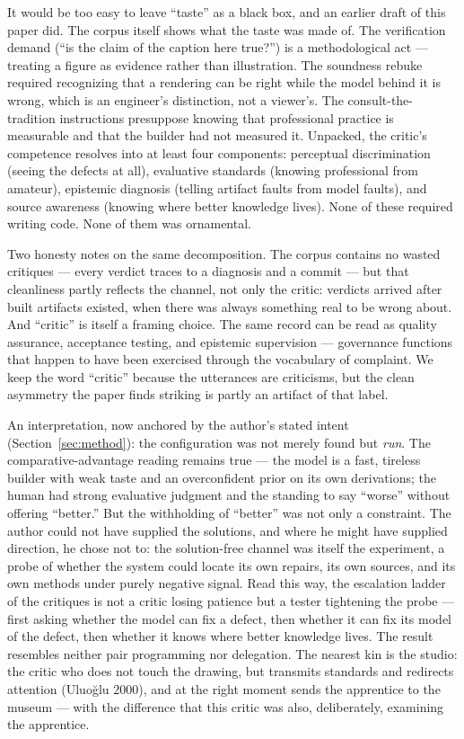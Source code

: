 \documentclass[12pt]{article}
\begin{document}
It would be too easy to leave ``taste'' as a black box, and an earlier draft of this paper did. The corpus itself shows what the taste was made of. The verification demand (``is the claim of the caption here true?'') is a methodological act — treating a figure as evidence rather than illustration. The soundness rebuke required recognizing that a rendering can be right while the model behind it is wrong, which is an engineer's distinction, not a viewer's. The consult-the-tradition instructions presuppose knowing that professional practice is measurable and that the builder had not measured it. Unpacked, the critic's competence resolves into at least four components: perceptual discrimination (seeing the defects at all), evaluative standards (knowing professional from amateur), epistemic diagnosis (telling artifact faults from model faults), and source awareness (knowing where better knowledge lives). None of these required writing code. None of them was ornamental.

Two honesty notes on the same decomposition. The corpus contains no wasted critiques — every verdict traces to a diagnosis and a commit — but that cleanliness partly reflects the channel, not only the critic: verdicts arrived after built artifacts existed, when there was always something real to be wrong about. And ``critic'' is itself a framing choice. The same record can be read as quality assurance, acceptance testing, and epistemic supervision — governance functions that happen to have been exercised through the vocabulary of complaint. We keep the word ``critic'' because the utterances are criticisms, but the clean asymmetry the paper finds striking is partly an artifact of that label.

An interpretation, now anchored by the author's stated intent (Section~\ref{sec:method}): the configuration was not merely found but \emph{run}. The comparative-advantage reading remains true — the model is a fast, tireless builder with weak taste and an overconfident prior on its own derivations; the human had strong evaluative judgment and the standing to say ``worse'' without offering ``better.'' But the withholding of ``better'' was not only a constraint. The author could not have supplied the solutions, and where he might have supplied direction, he chose not to: the solution-free channel was itself the experiment, a probe of whether the system could locate its own repairs, its own sources, and its own methods under purely negative signal. Read this way, the escalation ladder of the critiques is not a critic losing patience but a tester tightening the probe — first asking whether the model can fix a defect, then whether it can fix its model of the defect, then whether it knows where better knowledge lives. The result resembles neither pair programming nor delegation. The nearest kin is the studio: the critic who does not touch the drawing, but transmits standards and redirects attention (Uluoğlu 2000), and at the right moment sends the apprentice to the museum — with the difference that this critic was also, deliberately, examining the apprentice.
\end{document}
